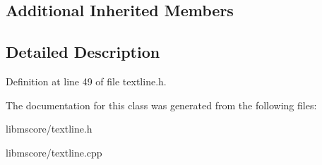 \subsection*{Additional Inherited Members}


\subsection{Detailed Description}


Definition at line 49 of file textline.\+h.



The documentation for this class was generated from the following files\+:\begin{DoxyCompactItemize}
\item 
libmscore/textline.\+h\item 
libmscore/textline.\+cpp\end{DoxyCompactItemize}

